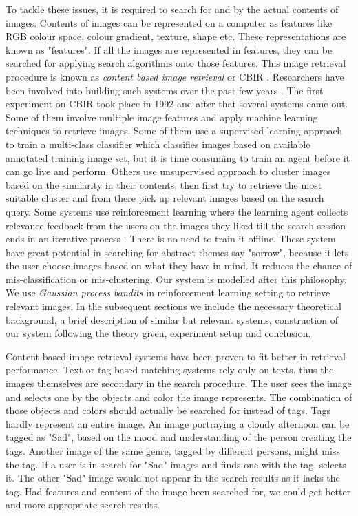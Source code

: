 \documentclass[english]{tktltiki}
\begin{document}
To tackle these issues, it is required to search for and by the actual contents of images. Contents of images can be represented on a computer as features like RGB colour space, colour gradient, texture, shape etc. These representations are known as "features". If all the images are represented in features, they can be searched for applying search algorithms onto those features. This image retrieval procedure is known as \textit{content based image retrieval} or CBIR \cite{cbir_1} \cite{cbir_2}. Researchers have been involved into building such systems over the past few years \cite{cbir_3} \cite{cbir_4}. The first experiment on CBIR took place in 1992 \cite{cbir_1st} and after that several systems came out. Some of them involve multiple image features and apply machine learning techniques to retrieve images. Some of them use a supervised learning approach to train a multi-class classifier which classifies images based on available annotated training image set, but it is time consuming to train an agent before it can go live and perform. Others use unsupervised approach to cluster images based on the similarity in their contents, then first try to retrieve the most suitable cluster and from there pick up relevant images based on the search query. Some systems use reinforcement learning where the learning agent collects relevance feedback \cite{rel_feed} from the users on the images they liked till the search session ends in an iterative process \cite{pichunter} \cite{PicSOM} \cite{inter_rel_feed}. There is no need to train it offline. These system have great potential in searching for abstract themes say "sorrow", because it lets the user choose images based on what they have in mind. It reduces the chance of mis-classification or mis-clustering. Our system is modelled after this philosophy. We use \textit{Gaussian process bandits} in reinforcement learning setting to retrieve relevant images. In the subsequent sections we include the necessary theoretical background, a brief description of similar but relevant systems, construction of our system following the theory given, experiment setup and conclusion. 

\iffalse
Content based image retrieval systems have been proven to fit better in retrieval performance. Text or tag based matching systems rely only on texts, thus the images themselves are secondary in the search procedure. The user sees the image and selects one by the objects and color the image represents. The combination of those objects and colors should actually be searched for instead of tags. Tags hardly represent an entire image. An image portraying a cloudy afternoon can be tagged as "Sad", based on the mood and understanding of the person creating the tags. Another image of the same genre, tagged by different persons, might miss the tag. If a user is in search for "Sad" images and finds one with the tag, selects it. The other "Sad" image would not appear in the search results as it lacks the tag. Had features and content of the image been searched for, we could get better and more appropriate search results.
\end{document}

